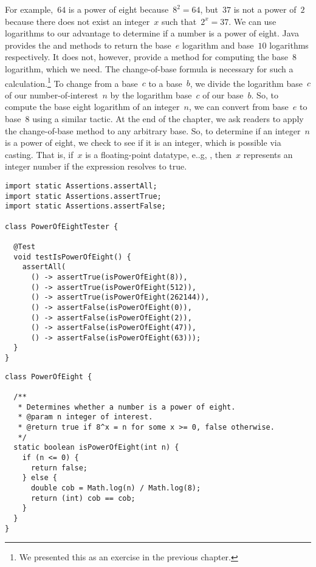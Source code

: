 For example,~$64$ is a power of eight because~$8^2=64$, but~$37$ is not a power of~$2$ because there does not exist an integer~$x$ such that~$2^x=37$.
We can use logarithms to our advantage to determine if a number is a power of eight.
Java provides the  and  methods to return the base~$e$ logarithm and base~$10$ logarithms respectively.
It does not, however, provide a method for computing the base~$8$ logarithm, which we need.
The change-of-base formula is necessary for such a calculation.\footnote{We presented this as an exercise in the previous chapter.}
To change from a base~$c$ to a base~$b$, we divide the logarithm base~$c$ of our number-of-interest~$n$ by the logarithm base~$c$ of our base~$b$.
So, to compute the base eight logarithm of an integer~$n$, we can convert from base~$e$ to base~$8$ using a similar tactic.
At the end of the chapter, we ask readers to apply the change-of-base method to any arbitrary base.
So, to determine if an integer~$n$ is a power of eight, we check to see if it is an integer, which is possible via casting. 
That is, if~$x$ is a floating-point datatype, e..g, , then~$x$ represents an integer number if the expression  resolves to true.

\begin{lstlisting}[language=MyJava]
import static Assertions.assertAll;
import static Assertions.assertTrue;
import static Assertions.assertFalse;

class PowerOfEightTester {

  @Test
  void testIsPowerOfEight() {
    assertAll(
      () -> assertTrue(isPowerOfEight(8)),
      () -> assertTrue(isPowerOfEight(512)),
      () -> assertTrue(isPowerOfEight(262144)),
      () -> assertFalse(isPowerOfEight(0)),
      () -> assertFalse(isPowerOfEight(2)),
      () -> assertFalse(isPowerOfEight(47)),
      () -> assertFalse(isPowerOfEight(63)));
  }
}
\end{lstlisting}

\begin{lstlisting}[language=MyJava]
class PowerOfEight {

  /**
   * Determines whether a number is a power of eight.
   * @param n integer of interest.
   * @return true if 8^x = n for some x >= 0, false otherwise.
   */
  static boolean isPowerOfEight(int n) {
    if (n <= 0) {
      return false;
    } else {
      double cob = Math.log(n) / Math.log(8);
      return (int) cob == cob;
    }
  }
}
\end{lstlisting}

